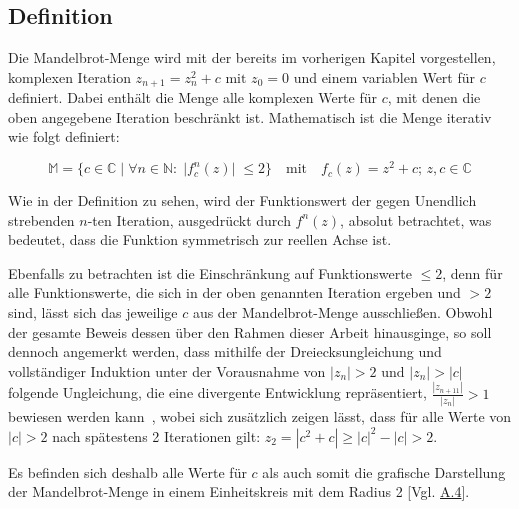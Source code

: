 \subsection{Definition}\label{subsec:definition}

Die Mandelbrot-Menge wird mit der bereits im vorherigen Kapitel vorgestellen,
komplexen Iteration $z_{n+1} = z_n^2 + c \text{ mit } z_0 = 0$ und einem variablen
Wert für $c$~\cite*[S.477ff.]{weitz_konkrete_2018} definiert.
Dabei enthält die Menge alle komplexen Werte für $c$, mit denen die
oben angegebene Iteration beschränkt ist.
Mathematisch ist die Menge iterativ wie folgt definiert:

\begin{equation}\label{eq:mathematical-definition}
  \mathbb{M} = \{c \in \mathbb{C} \; |\;  \forall n \in \mathbb{N}:\; |f_c^n(z)|\; \leqslant 2\}
  \quad
  \text{mit}
  \quad
  f_c(z) = z^2 + c;\, z,c \in \mathbb{C}
\end{equation}

Wie in der Definition zu sehen, wird der Funktionswert der
gegen Unendlich strebenden $n$-ten Iteration, ausgedrückt durch $f^n(z)$,
absolut betrachtet, was bedeutet, dass die Funktion symmetrisch zur reellen Achse ist.

Ebenfalls zu betrachten ist die Einschränkung auf Funktionswerte $\leqslant 2$, denn
für alle Funktionswerte, die sich in der oben genannten Iteration ergeben
und $> 2$ sind, lässt sich das jeweilige $c$ aus der Mandelbrot-Menge
ausschließen.
Obwohl der gesamte Beweis dessen über den Rahmen dieser Arbeit hinausginge,
so soll dennoch angemerkt werden, dass mithilfe der Dreiecksungleichung und
vollständiger Induktion unter der Vorausnahme von $|z_n| > 2 \text{ und } |z_n| > |c|$
folgende Ungleichung, die eine divergente Entwicklung repräsentiert,
$\frac{|z_{n+11}|}{|z_n|} > 1$ bewiesen werden kann~\cite{munafo_escape_1997},
wobei sich zusätzlich zeigen lässt, dass für alle Werte von $|c| > 2$
nach spätestens 2 Iterationen gilt: $z_2 = |c^2 + c| \geqslant |c|^2 - |c| > 2$.

Es befinden sich deshalb alle Werte für $c$ als auch somit die grafische Darstellung
der Mandelbrot-Menge in einem Einheitskreis mit dem Radius 2 [Vgl. \hyperref[app:4]{A.4}].